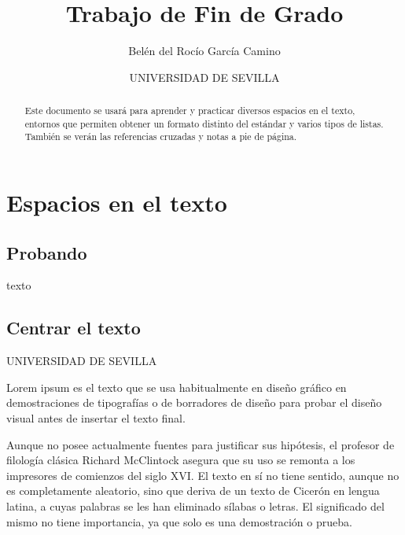 \documentclass[11pt,a4paper]{report}
\title{Trabajo de Fin de Grado}
\author{Belén del Rocío García Camino}
\date{UNIVERSIDAD DE SEVILLA} %
\begin{document}
\maketitle

\begin{abstract}
Este documento se usará para aprender y practicar diversos espacios en el texto, entornos que permiten obtener un formato distinto del estándar y varios tipos de listas. 
También se verán las referencias cruzadas y notas a pie de página. 
\end{abstract}
\chapter{Espacios en el texto}\label{cap.espacios}

\section {Probando}

texto

\section{Centrar el texto}\label{sec.centrar}
\centerline{UNIVERSIDAD DE SEVILLA}



Lorem ipsum es el texto que se usa habitualmente en diseño gráfico en demostraciones de tipografías o de borradores de diseño para probar el diseño visual antes de insertar el texto final.

Aunque no posee actualmente fuentes para justificar sus hipótesis, el profesor de filología clásica Richard McClintock asegura que su uso se remonta a los impresores de comienzos del siglo XVI. El texto en sí no tiene sentido, aunque no es completamente aleatorio, sino que deriva de un texto de Cicerón en lengua latina, a cuyas palabras se les han eliminado sílabas o letras. El significado del mismo no tiene importancia, ya que solo es una demostración o prueba. 
\end{document}
